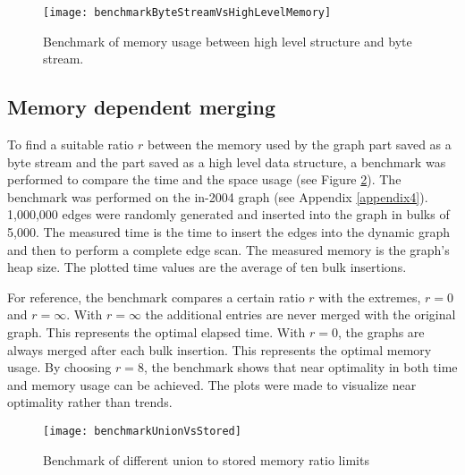 \begin{figure}[h]
\centering
\texttt{[image: benchmarkByteStreamVsHighLevelMemory]}    
\captionsetup{justification=centering}
\caption {Benchmark of memory usage between high level structure and byte stream. }
\label{fig:benchmarkByteStreamVsHighLevelMemory}
\end{figure}


\subsection{Memory dependent merging} \label{bench:unionVsStored}
To find a suitable ratio $r$ between the memory used by the graph part saved as a byte stream and the part saved as a high level data structure, a benchmark was performed to compare the time and the space usage (see Figure \ref{fig:benchmarkUnionVsStored}). The benchmark was performed on the in-2004 graph (see Appendix \ref{appendix4}). 1,000,000 edges were randomly generated and inserted into the graph in bulks of 5,000. The measured time is the time to insert the edges into the dynamic graph and then to perform a complete edge scan. The measured memory is the graph's heap size. The plotted time values are the average of ten bulk insertions.

For reference, the benchmark compares a certain ratio $r$ with the extremes, $r = 0$ and $r = \infty$. With $r = \infty$ the additional entries are never merged with the original graph. This represents the optimal elapsed time. With $r = 0$, the graphs are always merged after each bulk insertion. This represents the optimal memory usage. By choosing $r = 8$, the benchmark shows that near optimality in both time and memory usage can be achieved. The plots were made to visualize near optimality rather than trends.

\begin{figure}[h]
\centering
\texttt{[image: benchmarkUnionVsStored]}    
\captionsetup{justification=centering}
\caption {Benchmark of different union to stored memory ratio limits}
\label{fig:benchmarkUnionVsStored}
\end{figure}


\iffalse
